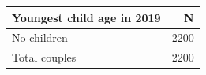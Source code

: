 
\begin{tabular}{lr}
\toprule
Youngest child age in 2019 & N\\
\midrule
No children & 2200\\
Total couples & 2200\\
\bottomrule
\end{tabular}
